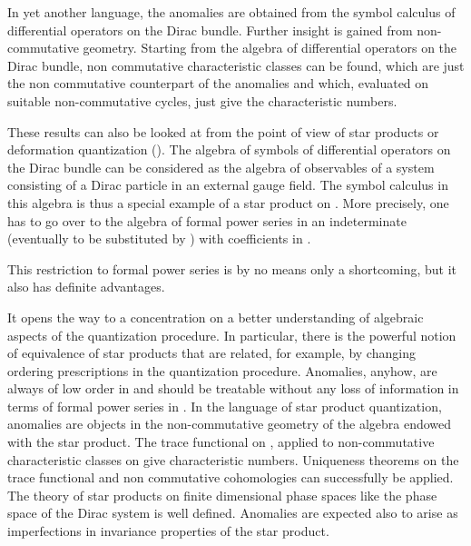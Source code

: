 \documentclass[a4paper,12pt]{article}
\begin{document}
In yet another language, the anomalies are obtained from the symbol calculus of
differential operators on the Dirac bundle. Further insight is gained from
non-commutative geometry. Starting from the algebra of differential operators on
the Dirac bundle, non commutative characteristic classes can be found, which are 
just the non commutative counterpart of the anomalies and which, evaluated on
suitable non-commutative cycles, just give the characteristic numbers.

These results can also be looked at from the point of view of star products or
deformation quantization (\cite{BFFLS77,BFFLS78,BCG97}). 
The algebra \coordHE{} of symbols of differential
operators on the Dirac bundle can be considered as the algebra of observables of 
a system consisting of a Dirac particle in an external gauge field. The symbol
calculus in this algebra is thus a special example of a star product on
\coordHE{}. More precisely, one has to go over to the algebra
\coordHE{} of formal power series in an
indeterminate \myHighlight{$\lambda$}\coordHE{} (eventually to be substituted by \myHighlight{$\hbar$}\coordHE{}) with
coefficients in \coordHE{}.

This restriction to formal power series is by no means only a shortcoming, but
it also has definite advantages.

It opens the way to a concentration on a better understanding of algebraic
aspects of the quantization procedure. In particular, there is the powerful notion
of equivalence of star products that are related, for example, by changing ordering
prescriptions in the quantization procedure. Anomalies, anyhow, are always of
low order in \myHighlight{$\hbar$}\coordHE{} and should be treatable without any loss of information in
terms of formal power series in \myHighlight{$\lambda$}\coordHE{}. In the language of star product
quantization, anomalies are objects in the non-commutative geometry of the
algebra \coordHE{} endowed with the star product. The trace functional
on \coordHE{}, applied to non-commutative characteristic classes on
\coordHE{}  give characteristic numbers. Uniqueness theorems on the
trace functional and non commutative cohomologies can successfully be applied. The
theory of star products on finite dimensional phase spaces like the phase space 
of the Dirac system is well defined. Anomalies are expected also to arise as
imperfections in invariance properties of the star product.
\end{document}
